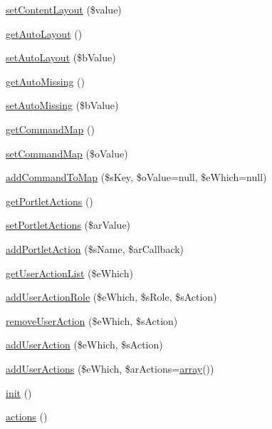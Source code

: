 \begin{DoxyCompactItemize}
\item 
\hyperlink{classCPSController_a1d05eefc9d36e19d69d21f84d0235ccb}{setContentLayout} (\$value)
\item 
\hyperlink{classCPSController_a5ca02f261713deddbc733f9889262bc6}{getAutoLayout} ()
\item 
\hyperlink{classCPSController_a4e941395b345a9e6dcf5881e1b500a7f}{setAutoLayout} (\$bValue)
\item 
\hyperlink{classCPSController_adcb044b9181c938a76c2f327a32a94cf}{getAutoMissing} ()
\item 
\hyperlink{classCPSController_af65a56f5b2e170bcc04e7e58e7053468}{setAutoMissing} (\$bValue)
\item 
\hyperlink{classCPSController_a89402cb8f4907eea9ae447e93580b78f}{getCommandMap} ()
\item 
\hyperlink{classCPSController_aae34745f7eebb0acbab0de4bfd82e8ef}{setCommandMap} (\$oValue)
\item 
\hyperlink{classCPSController_a9257841e8eb56318da1b6ccc7116f93b}{addCommandToMap} (\$sKey, \$oValue=null, \$eWhich=null)
\item 
\hyperlink{classCPSController_ae3e26353e430eb74e086211a9bfcb957}{getPortletActions} ()
\item 
\hyperlink{classCPSController_a99a826c8042e271ff66a753b32b8de92}{setPortletActions} (\$arValue)
\item 
\hyperlink{classCPSController_a1103c34c21ad3fac33acc05c977edd46}{addPortletAction} (\$sName, \$arCallback)
\item 
\hyperlink{classCPSController_a476bee2f85d13492b886802c3797fbd6}{getUserActionList} (\$eWhich)
\item 
\hyperlink{classCPSController_a773d259068d63346c06397103cf01889}{addUserActionRole} (\$eWhich, \$sRole, \$sAction)
\item 
\hyperlink{classCPSController_a14ef986219c300d32d5f8f2cf716353c}{removeUserAction} (\$eWhich, \$sAction)
\item 
\hyperlink{classCPSController_a2f24158b505e68f422cbc0682e588e14}{addUserAction} (\$eWhich, \$sAction)
\item 
\hyperlink{classCPSController_a208ea175f66013e55b87d10533089fd4}{addUserActions} (\$eWhich, \$arActions=\hyperlink{list_8php_aa3205d038c7f8feb5c9f01ac4dfadc88}{array}())
\item 
\hyperlink{classCPSController_a4be4055f3361d4800e16bc2e2e38cda6}{init} ()
\item 
\hyperlink{classCPSController_ae353790f09e1f72e1cc81d21a6eb9bed}{actions} ()

\end{DoxyCompactItemize}
